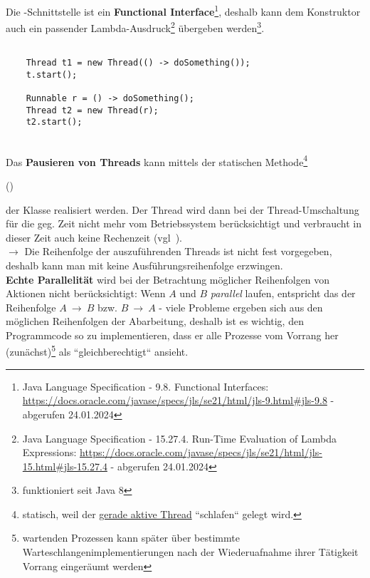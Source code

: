 Die -Schnittstelle ist ein \textbf{Functional Interface}\footnote{
    Java Language Specification - 9.8. Functional Interfaces: \url{https://docs.oracle.com/javase/specs/jls/se21/html/jls-9.html#jls-9.8} - abgerufen 24.01.2024
}, deshalb kann dem Konstruktor auch ein passender Lambda-Ausdruck\footnote{
    Java Language Specification - 15.27.4. Run-Time Evaluation of Lambda Expressions: \url{https://docs.oracle.com/javase/specs/jls/se21/html/jls-15.html#jls-15.27.4}  - abgerufen 24.01.2024
} übergeben werden\footnote{funktioniert seit Java 8}.

\begin{verbatim}

    Thread t1 = new Thread(() -> doSomething());
    t.start();

    Runnable r = () -> doSomething();
    Thread t2 = new Thread(r);
    t2.start();

\end{verbatim}\\

Das \textbf{Pausieren von Threads} kann mittels der statischen Methode\footnote{
    statisch, weil der \ul{gerade aktive Thread} ``schlafen`` gelegt wird.
}
\begin{center}
 ()
\end{center}
der Klasse  realisiert werden.
Der Thread wird dann bei der Thread-Umschaltung für die geg. Zeit nicht mehr vom Betriebssystem berücksichtigt und verbraucht in dieser Zeit auch keine Rechenzeit (vgl~\cite[16]{Oec22}).\\

$\rightarrow$ Die Reihenfolge der auszuführenden Threads ist nicht fest vorgegeben, deshalb kann man mit  keine Ausführungsreihenfolge erzwingen.\\

\noindent
\textbf{Echte Parallelität} wird bei der Betrachtung möglicher Reihenfolgen von Aktionen nicht berücksichtigt: Wenn $A$ und $B$ \textit{parallel} laufen, entspricht das der Reihenfolge $A\ \rightarrow\ B$ bzw. $B\ \rightarrow\ A$ - viele Probleme ergeben sich aus den möglichen Reihenfolgen der Abarbeitung, deshalb ist es wichtig, den Programmcode so zu implementieren, dass er alle Prozesse vom Vorrang her (zunächst)\footnote{
wartenden Prozessen kann später über bestimmte Warteschlangenimplementierungen nach der Wiederuafnahme ihrer Tätigkeit Vorrang eingeräumt werden
} als ``gleichberechtigt`` ansieht.

